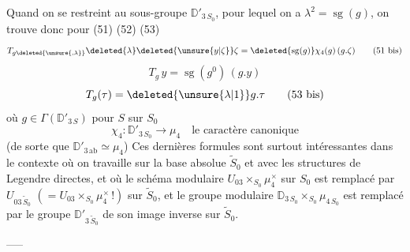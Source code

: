 Quand on se restreint au sous-groupe $\mathbb D'_{3\,S_0}$, pour lequel on a $\lambda^2=\operatorname{sg}(g)$, on trouve donc pour (51) (52) (53)
\[
T_{g\deleted{\unsure{,\lambda}}}\deleted{\lambda}\deleted{\unsure{y|\zeta}}\zeta=
\deleted{\operatorname{sg}(g)}\chi_4(g)\,(g.\zeta) \tag*{(51 bis)}
\]
\[
T_g\,y=\operatorname{sg}(g^0)\,(g.y) \tag*{(52 bis)}
\]
\[
T_g(\tau)=\deleted{\unsure{\lambda|1}}g.\tau \tag*{(53 bis)}
\]
où $g\in\Gamma(\mathbb D'_{3\,S})$ pour $S$ sur $S_0$
\[
\chi_4:\mathbb D'_{3\,S_0}\longrightarrow\mu_4
\quad\text{le caractère canonique} \tag*{(54)}
\]
(de sorte que $\mathbb D'_{3\,\mathrm{ab}}\simeq\mu_4$)
Ces dernières formules sont surtout intéressantes dans le contexte où on travaille  sur la base absolue $\widetilde S_0$ et avec les structures de Legendre directes, et où le schéma modulaire $U_{03}\times_{S_0}\mu_4^\times$ sur $S_0$ est remplacé par $U_{03\,\widetilde S_0}$ $(=U_{03}\times_{S_0}\mu_4^\times\,!)$ sur $\widetilde S_0$, et le groupe modulaire $\mathbb D_{3\,S_0}\times_{S_0}\mu_{4\,S_0}$ est remplacé par le groupe $\mathbb D'_{3\,\widetilde S_0}$ de  son image inverse sur $\widetilde S_0$.

\begin{center}--\quad --\quad --\end{center}

